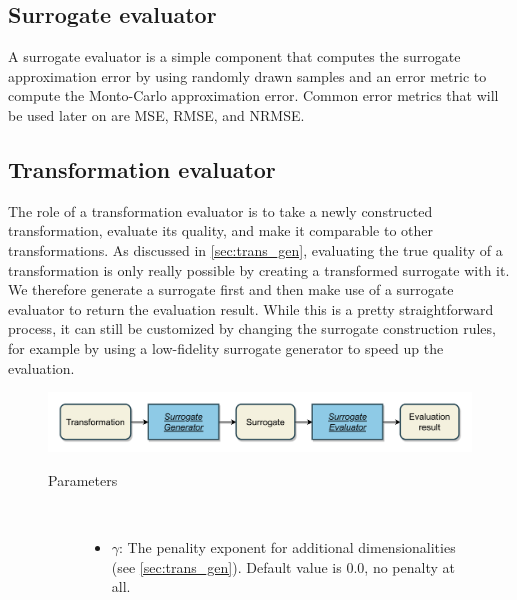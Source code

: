 \documentclass[
  a4paper,  %
  twoside,  %
  bibliography=totoc,
  headsepline,
  cleardoublepage=empty,
  parskip=half,
  draft=false
]{scrbook}
\begin{document}
\subsection {Surrogate evaluator}
\label{sec:se}

A surrogate evaluator is a simple component that computes the surrogate approximation error by using randomly drawn samples and an error metric to compute the Monto-Carlo approximation error.
Common error metrics that will be used later on are MSE, RMSE, and NRMSE.

\subsection {Transformation evaluator}
\label{sec:te}

The role of a transformation evaluator is to take a newly constructed transformation, evaluate its quality, and make it comparable to other transformations.
As discussed in \cref{sec:trans_gen}, evaluating the true quality of a transformation is only really possible by creating a transformed surrogate with it.
We therefore generate a surrogate first and then make use of a surrogate evaluator to return the evaluation result.
While this is a pretty straightforward process, it can still be customized by changing the surrogate construction rules, for example by using a low-fidelity surrogate generator to speed up the evaluation.

\begin{mdframed}[style=style,frametitle={Transformation evaluator (forward looking)}]
\begin{figure}[H]
\includegraphics[width=\textwidth]{graphics/TransformationEval.pdf}
\delimit
\begin{description}
\item[Parameters] {~ \begin{itemize}[\indent{}]
\item \texttt{\textbf{$\gamma$}}: The penality exponent for additional dimensionalities (see \cref{sec:trans_gen}). Default value is $0.0$, \ie no penalty at all.
\end{itemize}}
\end{description}
\delimit
{}
\label{fig:te}
\end{figure}
\end{mdframed}
\end{document}
